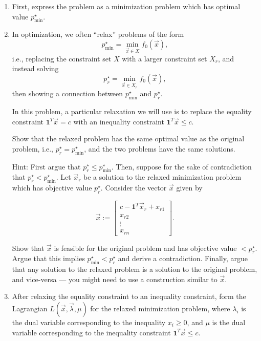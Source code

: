 \documentclass[
	12pt,
]{fphw}
\begin{document}
\begin{enumerate}

\item[(a)] First, express the problem as a minimization problem which has optimal value $p^\star_{\min}$.

\item[(b)] In optimization, we often “relax” problems of the form 
\[
p^\star_{\min} = \min_{\vec{x}\in X} f_0(\vec{x}),
\]
i.e., replacing the constraint set $X$ with a larger constraint set $X_r$, and instead solving
\[
p^\star_r = \min_{\vec{x}\in X_r} f_0(\vec{x}),
\]
then showing a connection between $p^\star_{\min}$ and $p^\star_r$.

In this problem, a particular relaxation we will use is to replace the equality constraint $\mathbf{1}^T \vec{x} = c$ with an inequality constraint $\mathbf{1}^T \vec{x} \le c$.

Show that the relaxed problem has the same optimal value as the original problem, i.e., $p^\star_r = p^\star_{\min}$, and the two problems have the same solutions.

Hint: First argue that $p^\star_r \le p^\star_{\min}$. Then, suppose for the sake of contradiction that $p^\star_r < p^\star_{\min}$. Let $\vec{x}_r$ be a solution to the relaxed minimization problem which has objective value $p^\star_r$. Consider the vector $\vec{x}$ given by

\[
\vec{x} :=
\begin{bmatrix}
c - \mathbf{1}^T \vec{x}_r + x_{r1} \\
x_{r2} \\
\vdots \\
x_{rn}
\end{bmatrix}.
\]

Show that $\vec{x}$ is feasible for the original problem and has objective value $< p^\star_r$. Argue that this implies $p^\star_{\min} < p^\star_r$ and derive a contradiction. Finally, argue that any solution to the relaxed problem is a solution to the original problem, and vice-versa — you might need to use a construction similar to $\vec{x}$.

\item[(c)] After relaxing the equality constraint to an inequality constraint, form the Lagrangian $L(\vec{x}, \vec{\lambda}, \mu)$ for the relaxed minimization problem, where $\lambda_i$ is the dual variable corresponding to the inequality $x_i \ge 0$, and $\mu$ is the dual variable corresponding to the inequality constraint $\mathbf{1}^T \vec{x} \le c$.


\end{enumerate}
\end{document}
